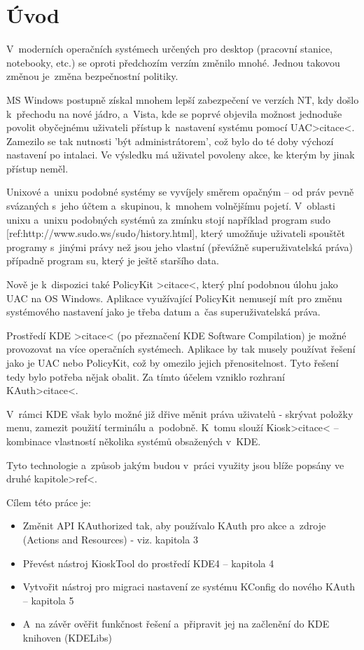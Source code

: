 \chapter{Úvod}
V~moderních operačních systémech určených pro desktop (pracovní stanice,
notebooky, etc.) se oproti předchozím verzím změnilo mnohé. Jednou takovou
změnou je~změna bezpečnostní politiky.

MS Windows postupně získal mnohem lepší zabezpečení ve verzích NT, kdy došlo
k~přechodu na nové jádro, a~Vista, kde se poprvé objevila možnost jednoduše
povolit obyčejnému uživateli přístup k~nastavení systému pomocí UAC>citace<.
Zamezilo se tak nutnosti 'být administrátorem', což bylo do té doby výchozí
nastavení po intalaci. Ve výsledku má uživatel povoleny akce, ke kterým by jinak
přístup neměl.

Unixové a~unixu podobné systémy se vyvíjely směrem opačným -- od práv pevně
svázaných s~jeho účtem a~skupinou, k~mnohem volnějšímu pojetí. V~oblasti unixu
a~unixu podobných systémů za zmínku stojí například program sudo
[ref:http://www.sudo.ws/sudo/history.html], který umožňuje uživateli spouštět
programy s~jinými právy než jsou jeho vlastní (převážně superuživatelská práva)
případně program su, který je ještě staršího data.

Nově je k~dispozici také PolicyKit >citace<, který plní podobnou úlohu jako UAC
na OS Windows. Aplikace využívající PolicyKit nemusejí mít pro změnu systémového
nastavení jako je třeba datum a~čas superuživatelská práva.

Prostředí KDE >citace< (po přeznačení KDE Software Compilation) je možné
provozovat na více operačních systémech. Aplikace by tak musely používat řešení
jako je UAC nebo PolicyKit, což by omezilo jejich přenositelnost. Tyto řešení
tedy bylo potřeba nějak obalit. Za tímto účelem vzniklo rozhraní KAuth>citace<.

V~rámci KDE však bylo možné již dřive měnit práva uživatelů - skrývat položky
menu, zamezit použití terminálu a~podobně. K~tomu slouží Kiosk>citace<
-- kombinace vlastností několika systémů obsažených v~KDE.

Tyto technologie a~způsob jakým budou v~práci využity jsou blíže popsány ve
druhé kapitole>ref<.

Cílem této práce je:
\begin{itemize}
\item Změnit API KAuthorized tak, aby používalo KAuth pro akce a~zdroje (Actions
 and Resources) - viz. kapitola 3
\item Převést nástroj KioskTool do prostředí KDE4 -- kapitola 4
\item Vytvořit nástroj pro migraci nastavení ze systému KConfig do nového KAuth
-- kapitola 5
\item A~na závěr ověřit funkčnost řešení a~připravit jej na začlenění do KDE
knihoven (KDELibs)
\end{itemize}

